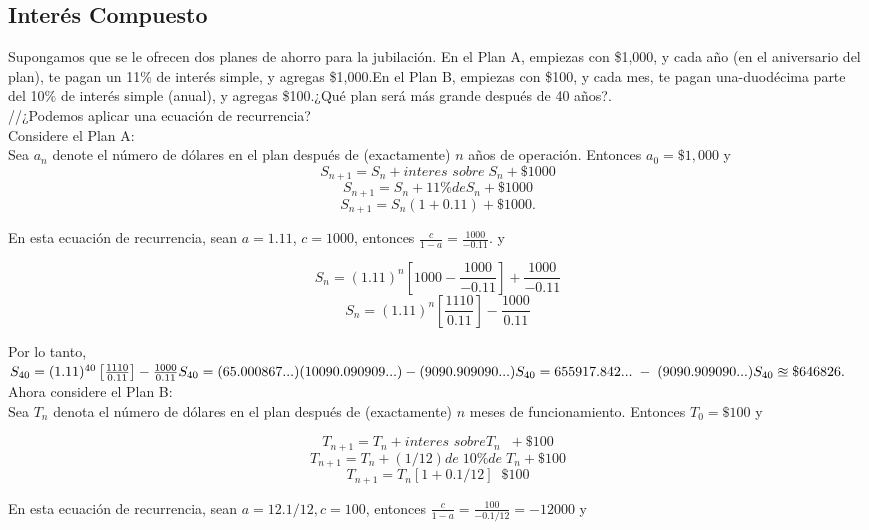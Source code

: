 \documentclass{article}
\begin{document}
\subsection{Interés Compuesto}

Supongamos que se le ofrecen dos planes de ahorro para la jubilación. En el Plan A, empiezas con \$1,000, y cada año (en el aniversario del plan), te pagan un 11\% de interés simple, y agregas \$1,000.En el Plan B, empiezas con \$100, y cada mes, te pagan una-duodécima parte del 10\% de interés simple (anual), y agregas \$100.¿Qué plan será más grande después de 40 años?.\\
//¿Podemos aplicar una ecuación de recurrencia?\\
Considere el Plan A:\\
Sea $a_n$ denote el número de dólares en el plan después de (exactamente) $n$ años de operación. Entonces 
$a_0 = \$1,000$ y
$$S_{n+1} = S_{n} + \textit{interes sobre}\; S_n + \$1000$$
$$S_{n+1} = S_{n} + 11\% \textit{de} S_n + \$1000$$
$$S_{n+1} = S_{n}(1+0.11) + \$1000.$$

En esta ecuación de recurrencia, sean $a=1.11$, $c=1000$, entonces $\frac{c}{1-a}=\frac{1000}{-0.11}$. y 

$$S_{n}= (1.11)^{n} \left[1000 - \frac{1000}{-0.11}\right] + \frac{1000}{-0.11}$$
$$S_{n}=(1.11)^{n}\left[\frac{1110}{0.11}\right]- \frac{1000}{0.11}$$

Por lo tanto,\\
$S_{40} = (1.11)^{40}\left[\frac{1110}{0.11}\right]- \frac{1000}{0.11} \\
S_{40}=(65.000867...)(10090.090909...)-(9090.909090...)\\
S_{40}=655917.842...\; - \; (9090.909090...)\\
S_{40} \approxeq \$646826.$ \\


Ahora considere el Plan B:\\
Sea $T_n$ denota el número de dólares en el plan después de (exactamente) $n$ meses de funcionamiento. Entonces $T_0 = \$100$ y

$$T_{n+1} = T_{n} + \textit{interes sobre} T_{n} \;\; + \$100$$
$$T_{n+1} = T_{n} + (1/12) \textit{de}\; 10\% \textit{de}\; T_{n} + \$100$$
$$T_{n+1} = T_{n}[1+0.1/12] \;\; \$100$$

En esta ecuación de recurrencia, sean $a=12.1/12, c=100$, entonces $\frac{c}{1-a} = \frac{100}{-0.1/12} = -12000$ y
\end{document}
